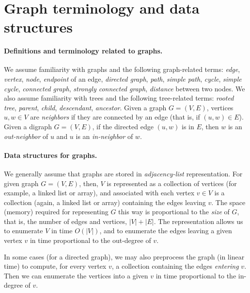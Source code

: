 \documentclass[11pt]{article}
\begin{document}
\newpage

\section{Graph terminology and data structures}\label{graphs: sec: intro}\label{graphs: sec: background}

\paragraph{Definitions and terminology related to graphs.}
We assume familiarity with graphs and the following graph-related terms:
\emph{edge}, \emph{vertex}, \emph{node}, \emph{endpoint} of an edge,
\emph{directed graph}, \emph{path}, \emph{simple path}, \emph{cycle}, \emph{simple cycle},
\emph{connected graph}, \emph{strongly connected graph}, \emph{distance} between two nodes.
We also assume familiarity with trees and the following tree-related terms:
\emph{rooted tree}, \emph{parent}, \emph{child}, \emph{descendant}, \emph{ancestor}.
Given a graph $G=(V,E)$,  
vertices $u,w\in V$ are \emph{neighbors} if they are connected by an edge (that is, if $(u,w)\in E$).
Given a digraph $G=(V,E)$,
if the directed edge $(u,w)$ is in $E$,
then $w$ is an \emph{out-neighbor} of $u$
and $u$ is an \emph{in-neighbor} of $w$.

\paragraph{Data structures for graphs.}

We generally assume that graphs are stored in \emph{adjacency-list} representation.
For given graph $G=(V,E)$,
then, $V$ is represented as a collection of vertices (for example, a linked list or array), and associated with each vertex $v\in V$ is a collection (again, a linked list or array) containing the edges leaving $v$.  The space (memory) required for representing $G$ this way is proportional to the \emph{size} of $G$, that is, the number of edges and vertices, $|V|+|E|$.  The representation allows us to enumerate $V$ in time $O(|V|)$, and to enumerate the edges leaving a given vertex $v$ in time proportional to the out-degree of $v$.  

In some cases (for a directed graph), we may also preprocess the graph (in linear time) to compute, for every vertex $v$, a collection containing the edges \emph{entering} $v$.   Then we can enumerate the vertices into a given $v$ in time proportional to the in-degree of $v$.
\end{document}
